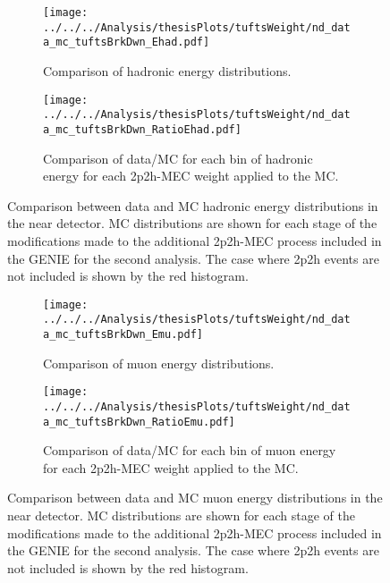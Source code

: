 


\begin{figure}
\centering
   \begin{subfigure}[b]{0.9\textwidth}
\texttt{[image: ../../../Analysis/thesisPlots/tuftsWeight/nd\_data\_mc\_tuftsBrkDwn\_Ehad.pdf]}
   \caption{Comparison of hadronic energy distributions.}
   \label{fig:tuftsWeight_hadE} 
\end{subfigure}
\begin{subfigure}[b]{0.9\textwidth}
\texttt{[image: ../../../Analysis/thesisPlots/tuftsWeight/nd\_data\_mc\_tuftsBrkDwn\_RatioEhad.pdf]}
   \caption{Comparison of data/MC for each bin of hadronic energy for
     each 2p2h-MEC weight applied to the MC.}
   \label{fig:tuftsWeight_hadERatio}
\end{subfigure}
\caption[]{Comparison between data and MC hadronic energy
  distributions in the near detector. MC distributions are shown for
  each stage of the modifications made to the additional 2p2h-MEC
  process included in the GENIE for the second analysis. The case
  where 2p2h events are not included is shown by the red histogram. }
\end{figure}

\begin{figure}
\centering
   \begin{subfigure}[b]{0.9\textwidth}
\texttt{[image: ../../../Analysis/thesisPlots/tuftsWeight/nd\_data\_mc\_tuftsBrkDwn\_Emu.pdf]}
   \caption{Comparison of muon energy distributions.}
   \label{fig:tuftsWeight_muE} 
\end{subfigure}
\begin{subfigure}[b]{0.9\textwidth}
\texttt{[image: ../../../Analysis/thesisPlots/tuftsWeight/nd\_data\_mc\_tuftsBrkDwn\_RatioEmu.pdf]}
   \caption{Comparison of data/MC for each bin of muon energy for
     each 2p2h-MEC weight applied to the MC.}
   \label{fig:tuftsWeight_muERatio}
\end{subfigure}
\caption[]{Comparison between data and MC muon energy
  distributions in the near detector. MC distributions are shown for
  each stage of the modifications made to the additional 2p2h-MEC
  process included in the GENIE for the second analysis. The case
  where 2p2h events are not included is shown by the red histogram. }
\end{figure}


